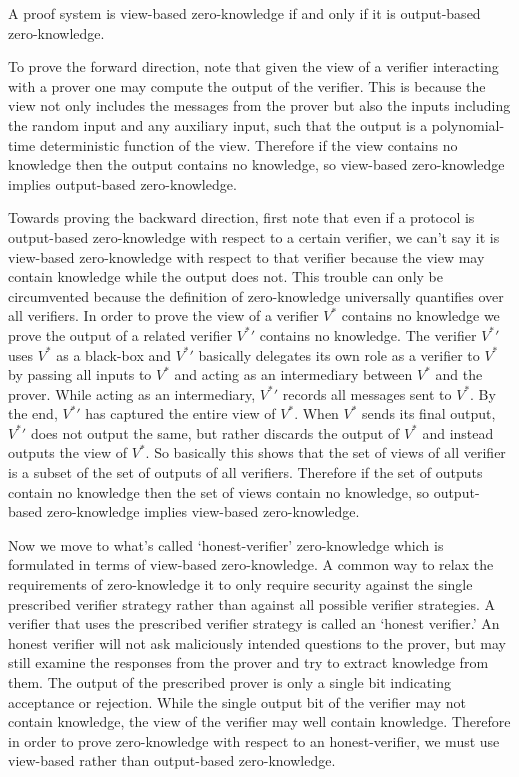 \begin{theorem}
    A proof system is view-based zero-knowledge if and only if it is output-based zero-knowledge.  

    \proof
    To prove the forward direction, note that given the view of a verifier interacting with a prover one may compute the output of the verifier.
    This is because the view not only includes the messages from the prover but also the inputs including the random input and any auxiliary input, such that the output is a polynomial-time deterministic function of the view.
    Therefore if the view contains no knowledge then the output contains no knowledge, so view-based zero-knowledge implies output-based zero-knowledge.

    Towards proving the backward direction, first note that even if a protocol is output-based zero-knowledge with respect to a certain verifier, we can't say it is view-based zero-knowledge with respect to that verifier because the view may contain knowledge while the output does not.
    This trouble can only be circumvented because the definition of zero-knowledge universally quantifies over all verifiers.
    In order to prove the view of a verifier $V^*$ contains no knowledge we prove the output of a related verifier ${V^*}'$ contains no knowledge.
    The verifier ${V^*}'$ uses $V^*$ as a black-box and ${V^*}'$ basically delegates its own role as a verifier to $V^*$ by passing all inputs to $V^*$ and acting as an intermediary between $V^*$ and the prover.
    While acting as an intermediary, ${V^*}'$ records all messages sent to $V^*$.
    By the end, ${V^*}'$ has captured the entire view of $V^*$.
    When $V^*$ sends its final output, ${V^*}'$ does not output the same, but rather discards the output of $V^*$ and instead outputs the view of $V^*$.
    So basically this shows that the set of views of all verifier is a subset of the set of outputs of all verifiers.
    Therefore if the set of outputs contain no knowledge then the set of views contain no knowledge, so output-based zero-knowledge implies view-based zero-knowledge.
\end{theorem}

Now we move to what's called `honest-verifier' zero-knowledge which is formulated in terms of view-based zero-knowledge.
A common way to relax the requirements of zero-knowledge it to only require security against the single prescribed verifier strategy rather than against all possible verifier strategies.
A verifier that uses the prescribed verifier strategy is called an `honest verifier.'
An honest verifier will not ask maliciously intended questions to the prover, but may still examine the responses from the prover and try to extract knowledge from them.
The output of the prescribed prover is only a single bit indicating acceptance or rejection.
While the single output bit of the verifier may not contain knowledge, the view of the verifier may well contain knowledge.
Therefore in order to prove zero-knowledge with respect to an honest-verifier, we must use view-based rather than output-based zero-knowledge.

